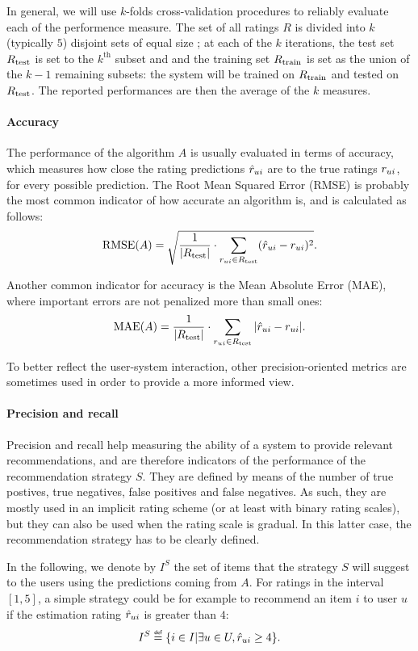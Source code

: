In general, we will use $k$-folds cross-validation procedures to reliably
evaluate each of the performence measure. The set of all ratings $R$ is divided
into $k$ (typically $5$) disjoint sets of equal size ; at each of the $k$ iterations, the test
set $R_{\text{test}}$ is set to the $k^{\text{th}}$ subset and and the training set
$R_{\text{train}}$ is set as the union of the $k - 1$ remaining subsets: the system will
be trained on $R_{\text{train}}$ and tested on $R_{\text{test}}$. The reported performances are
then the average of the $k$ measures.

\paragraph{Accuracy\\}
The performance of the algorithm $A$ is usually evaluated in terms of accuracy,
which measures how close the rating predictions $\hat{r}_{ui}$ are to the true
ratings $r_{ui}$, for every possible prediction. The Root Mean Squared Error
(RMSE) is probably the most common indicator of how accurate an algorithm is,
and is calculated as follows:
$$\text{RMSE}(A) = \sqrt{\frac{1}{|R_{\text{test}}|} \cdot \sum_{r_{ui} \in
R_{\text{test}}}(\hat{r}_{ui} - r_{ui})^2}.$$

Another common indicator for accuracy is the Mean Absolute Error (MAE), where
important errors are not penalized more than small ones:
$$\text{MAE}(A) = \frac{1}{|R_{\text{test}}|} \cdot \sum_{r_{ui} \in R_{\text{test}}}|\hat{r}_{ui} -
r_{ui}|.$$


To better reflect the user-system interaction, other precision-oriented metrics
are sometimes used in order to provide a more informed view.

\paragraph{Precision and recall\\}
Precision and recall help measuring the ability of a system to provide relevant
recommendations, and are therefore indicators of the performance of the
recommendation strategy $S$. They are defined by means of the number of true
postives, true negatives, false positives and false negatives. As such, they
are mostly used in an implicit rating scheme (or at least with binary rating
scales), but they can also be used when the rating scale is gradual. In this
latter case, the recommendation strategy has to be clearly defined.

In the following, we denote by $I^S$ the set of items that the strategy $S$
will suggest to the users using the predictions coming from $A$. For
ratings in the interval $[1, 5]$, a simple strategy could be for example to
recommend an item $i$ to user $u$ if the estimation rating $\hat{r}_{ui}$ is
greater than $4$:
$$I^S \eqdef \{i \in I | \exists u \in U, \predrui \geq 4\}.$$

